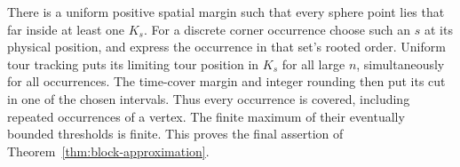 There is a uniform positive spatial margin such that every
sphere point lies that far inside at least one \(K_s\).  For a
discrete corner occurrence choose such an \(s\) at its physical
position, and express the occurrence in that set's rooted order.
Uniform tour tracking puts its limiting tour position in \(K_s\)
for all large \(n\), simultaneously for all occurrences.
The time-cover margin and integer rounding then put its cut in
one of the chosen intervals.  Thus every occurrence is covered,
including repeated occurrences of a vertex.  The finite
maximum of their eventually bounded thresholds is finite.
This proves the final assertion of
Theorem~\ref{thm:block-approximation}.
